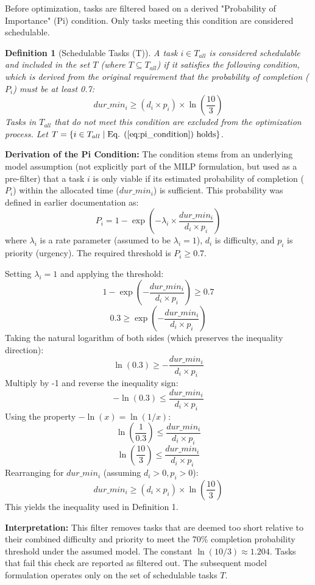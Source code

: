 \documentclass{article}
\newtheorem{definition}{Definition} %
\begin{document}
Before optimization, tasks are filtered based on a derived "Probability of Importance" (Pi) condition. Only tasks meeting this condition are considered schedulable.

\begin{definition}[Schedulable Tasks (T)]
A task $i \in T_{all}$ is considered schedulable and included in the set $T$ (where $T \subseteq T_{all}$) if it satisfies the following condition, which is derived from the original requirement that the probability of completion ($P_i$) must be at least 0.7:
\begin{equation}
dur\_min_i \ge (d_i \times p_i) \times \ln\left(\frac{10}{3}\right)
\label{eq:pi_condition}\end{equation}
Tasks in $T_{all}$ that do not meet this condition are excluded from the optimization process. Let $T = \{ i \in T_{all} \mid \text{Eq. (\ref{eq:pi_condition}) holds} \}$.
\end{definition}

\textbf{Derivation of the Pi Condition:}
The condition stems from an underlying model assumption (not explicitly part of the MILP formulation, but used as a pre-filter) that a task $i$ is only viable if its estimated probability of completion ($P_i$) within the allocated time ($dur\_min_i$) is sufficient. This probability was defined in earlier documentation as:
\[ P_i = 1 - \exp\left(-\lambda_i \times \frac{dur\_min_i}{d_i \times p_i}\right) \]
where $\lambda_i$ is a rate parameter (assumed to be $\lambda_i = 1$), $d_i$ is difficulty, and $p_i$ is priority (urgency). The required threshold is $P_i \ge 0.7$.

Setting $\lambda_i = 1$ and applying the threshold:
\[ 1 - \exp\left(-\frac{dur\_min_i}{d_i \times p_i}\right) \ge 0.7 \]
\[ 0.3 \ge \exp\left(-\frac{dur\_min_i}{d_i \times p_i}\right) \]
Taking the natural logarithm of both sides (which preserves the inequality direction):
\[ \ln(0.3) \ge -\frac{dur\_min_i}{d_i \times p_i} \]
Multiply by -1 and reverse the inequality sign:
\[ -\ln(0.3) \le \frac{dur\_min_i}{d_i \times p_i} \]
Using the property $-\ln(x) = \ln(1/x)$:
\[ \ln\left(\frac{1}{0.3}\right) \le \frac{dur\_min_i}{d_i \times p_i} \]
\[ \ln\left(\frac{10}{3}\right) \le \frac{dur\_min_i}{d_i \times p_i} \]
Rearranging for $dur\_min_i$ (assuming $d_i > 0, p_i > 0$):
\[ dur\_min_i \ge (d_i \times p_i) \times \ln\left(\frac{10}{3}\right) \]
This yields the inequality used in Definition 1.

\textbf{Interpretation:} This filter removes tasks that are deemed too short relative to their combined difficulty and priority to meet the 70\% completion probability threshold under the assumed model. The constant $\ln(10/3) \approx 1.204$. Tasks that fail this check are reported as filtered out. The subsequent model formulation operates only on the set of schedulable tasks $T$.
\end{document}
